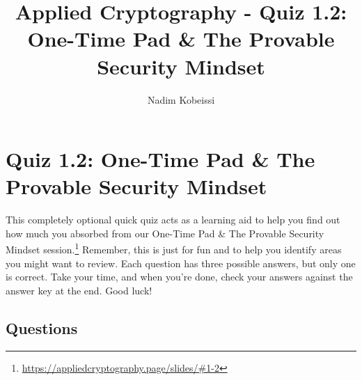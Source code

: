 \documentclass[10pt,a4paper,american]{exam}
\title{Applied Cryptography - Quiz 1.2: One-Time Pad \& The Provable Security Mindset}
\author{Nadim Kobeissi}
\begin{document}
\classhandoutheader
\section*{Quiz 1.2: One-Time Pad \& The Provable Security Mindset}

\begin{tcolorbox}[colframe=OliveGreen!30!white,colback=OliveGreen!5!white]
	This completely optional quick quiz acts as a learning aid to help you find out how much you absorbed from our One-Time Pad \& The Provable Security Mindset session.\footnote{\url{https://appliedcryptography.page/slides/\#1-2}} Remember, this is just for fun and to help you identify areas you might want to review. Each question has three possible answers, but only one is correct. Take your time, and when you're done, check your answers against the answer key at the end. Good luck!
\end{tcolorbox}

\subsection*{Questions}
\end{document}
